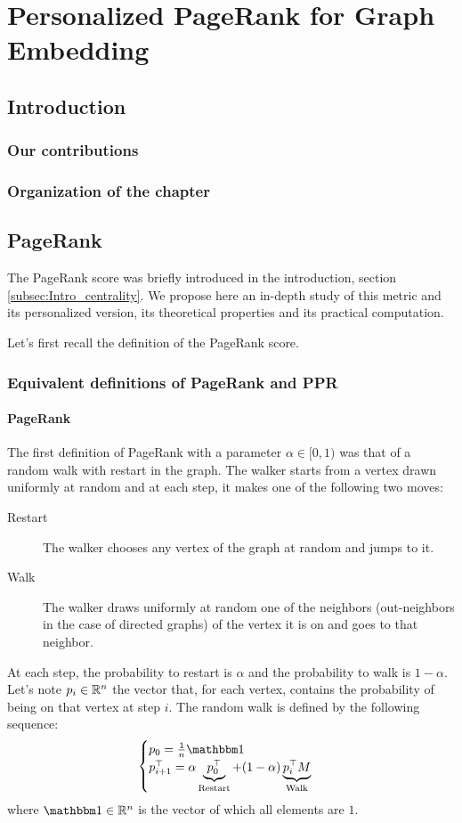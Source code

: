 \chapter{Personalized PageRank for Graph Embedding}
\section{Introduction}
\subsection{Our contributions}
\subsection{Organization of the chapter}
\section{PageRank}
The PageRank score was briefly introduced in the introduction, section \ref{subsec:Intro_centrality}. We propose here an in-depth study of this metric and its personalized version, its theoretical properties and its practical computation.

Let's first recall the definition of the PageRank score.

\subsection{Equivalent definitions of PageRank and PPR} \label{subsec:ppr_definitions}
\subsubsection{PageRank}
The first definition of PageRank with a parameter $\alpha \in [0, 1)$ was that of a random walk with restart in the graph. The walker starts from a vertex drawn uniformly at random and at each step, it makes one of the following two moves:
\begin{description}
    \item[Restart] The walker chooses any vertex of the graph at random and jumps to it.
    \item[Walk] The walker draws uniformly at random one of the neighbors (out-neighbors in the case of directed graphs) of the vertex it is on and goes to that neighbor.
\end{description}

At each step, the probability to restart is $\alpha$ and the probability to walk is $1-\alpha$. Let's note $p_i \in \mathbb{R}^n$ the vector that, for each vertex, contains the probability of being on that vertex at step $i$. The random walk is defined by the following sequence:
\begin{equation}\label{eq:pr_def_as_sequence}
    \begin{cases}
        p_0 = \frac{1}{n}\ones\\
        p_{i+1}^\top = \alpha \underbrace{p_0^\top}_{\text{Restart}} + (1-\alpha)\underbrace{p_i^\top M}_{\text{Walk}}
    \end{cases}
\end{equation}
where $\ones \in \realset^n$ is the vector of which all elements are $1$.

